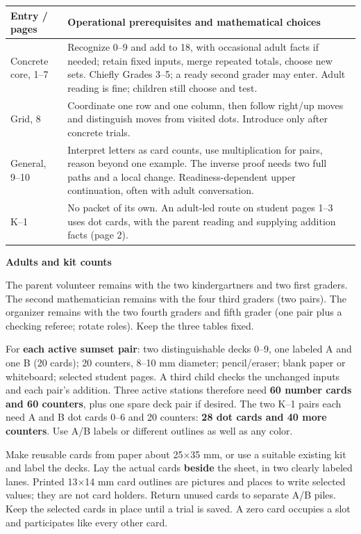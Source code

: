 \documentclass[11pt]{article}
\newcommand{\heading}[1]{\vspace{4pt}{\large\bfseries #1}\par}
\newcommand{\sub}[1]{\textbf{#1}\par}
\begin{document}
\begin{tabularx}{\linewidth}{@{}p{29mm}X@{}}
\toprule
Entry / pages & Operational prerequisites and mathematical choices\\\midrule
Concrete core, 1--7 & Recognize 0--9 and add to 18, with occasional adult facts if needed; retain fixed inputs, merge repeated totals, choose new sets. Chiefly Grades 3--5; a ready second grader may enter. Adult reading is fine; children still choose and test.\\
Grid, 8 & Coordinate one row and one column, then follow right/up moves and distinguish moves from visited dots. Introduce only after concrete trials.\\
General, 9--10 & Interpret letters as card counts, use multiplication for pairs, reason beyond one example. The inverse proof needs two full paths and a local change. Readiness-dependent upper continuation, often with adult conversation.\\
K--1 & No packet of its own. An adult-led route on student pages 1--3 uses dot cards, with the parent reading and supplying addition facts (page 2).\\\bottomrule
\end{tabularx}
\newpage

\heading{Prepare for the fixed K--1 / 2--3 / 4--5 tables}
\sub{Adults and kit counts}
The parent volunteer remains with the two kindergartners and two first graders. The second mathematician remains with the four third graders (two pairs). The organizer remains with the two fourth graders and fifth grader (one pair plus a checking referee; rotate roles). Keep the three tables fixed.

For \textbf{each active sumset pair}: two distinguishable decks 0--9, one labeled A and one B (20 cards); 20 counters, 8--10 mm diameter; pencil/eraser; blank paper or whiteboard; selected student pages. A third child checks the unchanged inputs and each pair's addition. Three active stations therefore need \textbf{60 number cards and 60 counters}, plus one spare deck pair if desired. The two K--1 pairs each need A and B dot cards 0--6 and 20 counters: \textbf{28 dot cards and 40 more counters}. Use A/B labels or different outlines as well as any color.

Make reusable cards from paper about 25$\times$35 mm, or use a suitable existing kit and label the decks. Lay the actual cards \textbf{beside} the sheet, in two clearly labeled lanes. Printed 13$\times$14 mm card outlines are pictures and places to write selected values; they are not card holders. Return unused cards to separate A/B piles. Keep the selected cards in place until a trial is saved. A zero card occupies a slot and participates like every other card.
\end{document}
